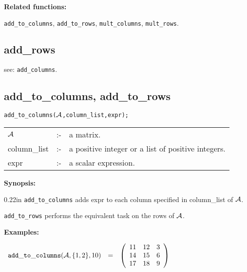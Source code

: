 {\bf Related functions:}

\hspace*{0.175in} {\tt add\_to\_columns}, {\tt add\_to\_rows}, 
{\tt mult\_columns}, {\tt mult\_rows}.


\subsection{add\_rows}

\hspace*{0.175in} see: {\tt add\_columns}.


\subsection{add\_to\_columns, add\_to\_rows}


\hspace*{0.175in} {\tt add\_to\_columns(${\cal A}$,column\_list,expr);}

\hspace*{0.1in}
\begin{tabular}{l l l}
${\cal A}$   &:-& a matrix. \\
column\_list &:-& a positive integer or a list of positive integers. \\
expr        &:-& a scalar expression.
\end{tabular}

{\bf Synopsis:} %

\begin{addtolength}{\leftskip}{0.22in}
{\tt add\_to\_columns} adds expr to each column specified in 
column\_list of ${\cal A}$.  

{\tt add\_to\_rows} performs the equivalent task on the rows of 
${\cal A}$.

\end{addtolength}

{\bf Examples:}

\begin{flushleft}  
\hspace*{0.175in}
\begin{math}
\begin{array}{ccc}
{\tt add\_to\_columns}({\cal A},\{1,2\},10) & = & 
\left( \begin{array}{ccc} 11 & 12 & 3 \\ 14 & 15 & 6 \\ 17 & 18 & 9 
\end{array} \right)  
\end{array}
\end{math}
\end{flushleft}

